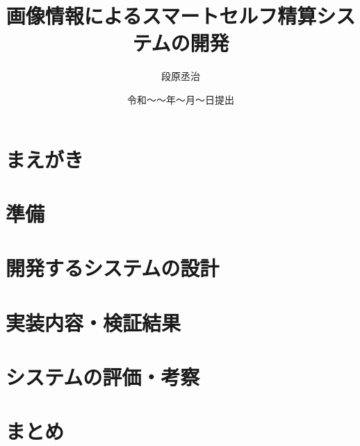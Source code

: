 

\newenvironment{indention}[1]{\par
\addtolength{\leftskip}{#1}
\begingroup}{\endgroup\par}

\title{画像情報によるスマートセルフ精算システムの開発}
\author{段原丞治}
\date{令和～～年～月～日提出}


\maketitle
\tableofcontents
\cleardoublepage
{}

\chapter{まえがき}


\chapter{準備}


\chapter{開発するシステムの設計}






\chapter{実装内容・検証結果}



\chapter{システムの評価・考察}


\chapter{まとめ}



\newpage
{}
